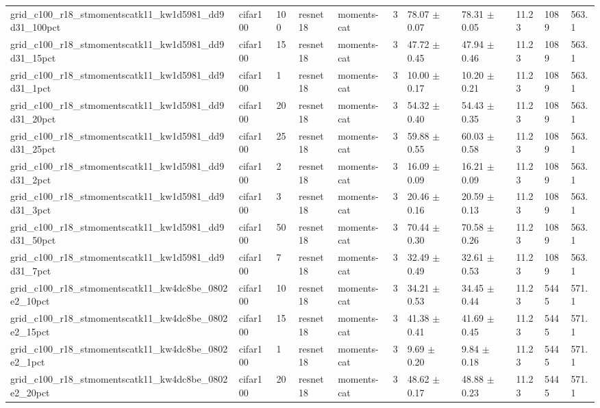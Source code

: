 \begin{tabular}{lllllllllll}
grid_c100_r18_stmomentscatk11_kw1d5981_dd9d31_100pct & cifar100 & 100 & resnet18 & moments-cat & 3 & 78.07 $\pm$ 0.07 & 78.31 $\pm$ 0.05 & 11.23 & 1089 & 563.1 \\
grid_c100_r18_stmomentscatk11_kw1d5981_dd9d31_15pct & cifar100 & 15 & resnet18 & moments-cat & 3 & 47.72 $\pm$ 0.45 & 47.94 $\pm$ 0.46 & 11.23 & 1089 & 563.1 \\
grid_c100_r18_stmomentscatk11_kw1d5981_dd9d31_1pct & cifar100 & 1 & resnet18 & moments-cat & 3 & 10.00 $\pm$ 0.17 & 10.20 $\pm$ 0.21 & 11.23 & 1089 & 563.1 \\
grid_c100_r18_stmomentscatk11_kw1d5981_dd9d31_20pct & cifar100 & 20 & resnet18 & moments-cat & 3 & 54.32 $\pm$ 0.40 & 54.43 $\pm$ 0.35 & 11.23 & 1089 & 563.1 \\
grid_c100_r18_stmomentscatk11_kw1d5981_dd9d31_25pct & cifar100 & 25 & resnet18 & moments-cat & 3 & 59.88 $\pm$ 0.55 & 60.03 $\pm$ 0.58 & 11.23 & 1089 & 563.1 \\
grid_c100_r18_stmomentscatk11_kw1d5981_dd9d31_2pct & cifar100 & 2 & resnet18 & moments-cat & 3 & 16.09 $\pm$ 0.09 & 16.21 $\pm$ 0.09 & 11.23 & 1089 & 563.1 \\
grid_c100_r18_stmomentscatk11_kw1d5981_dd9d31_3pct & cifar100 & 3 & resnet18 & moments-cat & 3 & 20.46 $\pm$ 0.16 & 20.59 $\pm$ 0.13 & 11.23 & 1089 & 563.1 \\
grid_c100_r18_stmomentscatk11_kw1d5981_dd9d31_50pct & cifar100 & 50 & resnet18 & moments-cat & 3 & 70.44 $\pm$ 0.30 & 70.58 $\pm$ 0.26 & 11.23 & 1089 & 563.1 \\
grid_c100_r18_stmomentscatk11_kw1d5981_dd9d31_7pct & cifar100 & 7 & resnet18 & moments-cat & 3 & 32.49 $\pm$ 0.49 & 32.61 $\pm$ 0.53 & 11.23 & 1089 & 563.1 \\
grid_c100_r18_stmomentscatk11_kw4dc8be_0802e2_10pct & cifar100 & 10 & resnet18 & moments-cat & 3 & 34.21 $\pm$ 0.53 & 34.45 $\pm$ 0.44 & 11.23 & 5445 & 571.1 \\
grid_c100_r18_stmomentscatk11_kw4dc8be_0802e2_15pct & cifar100 & 15 & resnet18 & moments-cat & 3 & 41.38 $\pm$ 0.41 & 41.69 $\pm$ 0.45 & 11.23 & 5445 & 571.1 \\
grid_c100_r18_stmomentscatk11_kw4dc8be_0802e2_1pct & cifar100 & 1 & resnet18 & moments-cat & 3 & 9.69 $\pm$ 0.20 & 9.84 $\pm$ 0.18 & 11.23 & 5445 & 571.1 \\
grid_c100_r18_stmomentscatk11_kw4dc8be_0802e2_20pct & cifar100 & 20 & resnet18 & moments-cat & 3 & 48.62 $\pm$ 0.17 & 48.88 $\pm$ 0.23 & 11.23 & 5445 & 571.1 \\

\end{tabular}
